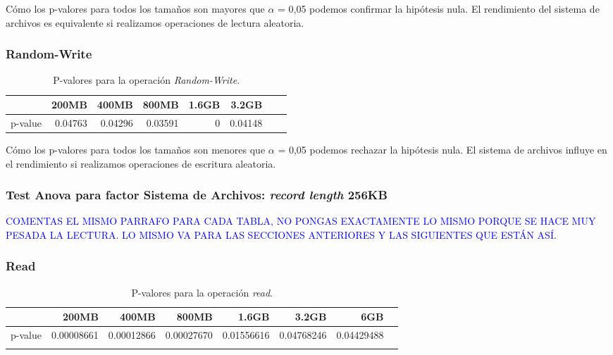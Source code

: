Cómo los p-valores para todos los tamaños son mayores que $\alpha$ = 0,05 podemos confirmar la hipótesis nula. El rendimiento del sistema de archivos es equivalente si realizamos operaciones de lectura aleatoria. 

\subsubsection{Random-Write}
\begin{table}[!htp]\centering
\scriptsize
\begin{tabular}{lrrrrrrr}\toprule
&200MB &400MB &800MB &1.6GB &3.2GB \\\midrule
p-value &0.04763 &0.04296 &0.03591 &0 &0.04148 \\
\bottomrule
\end{tabular}
\caption{P-valores para la operación \textit{Random-Write}.}\label{tab: }
\end{table}

Cómo los p-valores para todos los tamaños son menores que $\alpha$ = 0,05 podemos rechazar la hipótesis nula. El sistema de archivos influye en el rendimiento si realizamos operaciones de escritura aleatoria. 














\subsubsection{Test Anova para factor Sistema de Archivos: \textit{record length} 256KB}

\textcolor{blue}{COMENTAS EL MISMO PARRAFO PARA CADA TABLA, NO PONGAS EXACTAMENTE LO MISMO PORQUE SE HACE MUY PESADA LA LECTURA. LO MISMO VA PARA LAS SECCIONES ANTERIORES Y LAS SIGUIENTES QUE ESTÁN ASÍ.}

\subsubsection{Read}
\begin{table}[!htp]\centering
\scriptsize
\begin{tabular}{lrrrrrrr}\toprule
&200MB &400MB &800MB &1.6GB &3.2GB &6GB \\\midrule
p-value &0.00008661 &0.00012866 &0.00027670 &0.01556616 &0.04768246 &0.04429488 \\ \\
\bottomrule
\end{tabular}
\caption{P-valores para la operación \textit{read}.}\label{tab: }
\end{table}


